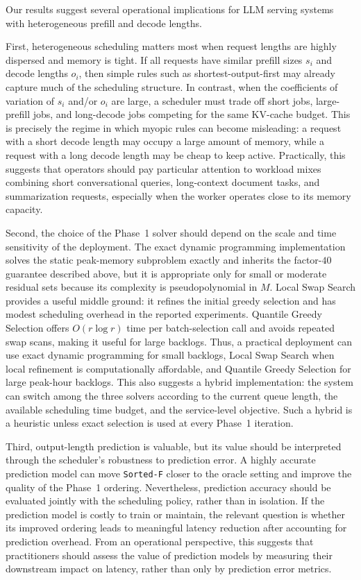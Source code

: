 \documentclass[nonblindrev]{informs3_hide}
\newcommand{\sortF}{\texttt{Sorted-F}}
\begin{document}
Our results suggest several operational implications for LLM serving systems with heterogeneous prefill and decode lengths.

First, heterogeneous scheduling matters most when request lengths are highly dispersed and memory is tight. If all requests have similar prefill sizes $s_i$ and decode lengths $o_i$, then simple rules such as shortest-output-first may already capture much of the scheduling structure. In contrast, when the coefficients of variation of $s_i$ and/or $o_i$ are large, a scheduler must trade off short jobs, large-prefill jobs, and long-decode jobs competing for the same KV-cache budget. This is precisely the regime in which myopic rules can become misleading: a request with a short decode length may occupy a large amount of memory, while a request with a long decode length may be cheap to keep active. Practically, this suggests that operators should pay particular attention to workload mixes combining short conversational queries, long-context document tasks, and summarization requests, especially when the worker operates close to its memory capacity.

Second, the choice of the Phase~1 solver should depend on the scale and time sensitivity of the deployment. The exact dynamic programming implementation solves the static peak-memory subproblem exactly and inherits the factor-$40$ guarantee described above, but it is appropriate only for small or moderate residual sets because its complexity is pseudopolynomial in $M$. Local Swap Search provides a useful middle ground: it refines the initial greedy selection and has modest scheduling overhead in the reported experiments. Quantile Greedy Selection offers $O(r\log r)$ time per batch-selection call and avoids repeated swap scans, making it useful for large backlogs. Thus, a practical deployment can use exact dynamic programming for small backlogs, Local Swap Search when local refinement is computationally affordable, and Quantile Greedy Selection for large peak-hour backlogs. This also suggests a hybrid implementation: the system can switch among the three solvers according to the current queue length, the available scheduling time budget, and the service-level objective. Such a hybrid is a heuristic unless exact selection is used at every Phase~1 iteration.

Third, output-length prediction is valuable, but its value should be interpreted through the scheduler's robustness to prediction error. A highly accurate prediction model can move \sortF{} closer to the oracle setting and improve the quality of the Phase~1 ordering. Nevertheless, prediction accuracy should be evaluated jointly with the scheduling policy, rather than in isolation. If the prediction model is costly to train or maintain, the relevant question is whether its improved ordering leads to meaningful latency reduction after accounting for prediction overhead. From an operational perspective, this suggests that practitioners should assess the value of prediction models by measuring their downstream impact on latency, rather than only by prediction error metrics.
\end{document}
